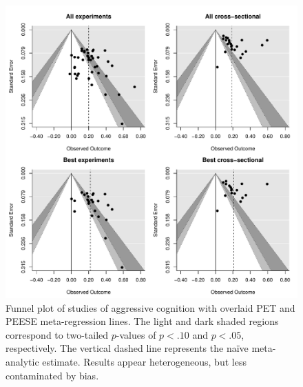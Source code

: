 \documentclass[man]{apa6}
\begin{document}
\begin{figure}
	\includegraphics[width = \textwidth, keepaspectratio]{funnels-0_AggCog.pdf}
	\caption{Funnel plot of studies of aggressive cognition with overlaid PET and PEESE meta-regression lines. The light and dark shaded regions correspond to two-tailed $p$-values of $p < .10$ and $p < .05$, respectively. The vertical dashed line represents the na{\"i}ve meta-analytic estimate. Results appear heterogeneous, but less contaminated by bias.}
	\label{funnel-aggcog}
\end{figure}
\end{document}
